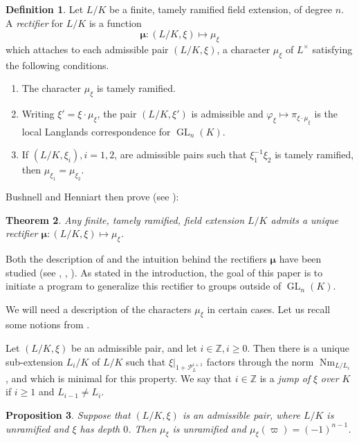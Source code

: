 \documentclass[11pt]{amsart}
\theoremstyle{plain}
\newtheorem{theorem}{Theorem}[section]
\newtheorem{proposition}[theorem]{Proposition}
\theoremstyle{definition}
\newtheorem{definition}[theorem]{Definition}
\DeclareMathOperator{\Nm}{Nm}
\DeclareMathOperator{\GL}{GL}
\newcommand{\PL}{\mathcal{P}_L}
\newcommand{\bmu}{\boldsymbol\mu}
\begin{document}
\begin{definition}\label{rectifierbushnellhenniart}
Let $L/K$ be a finite, tamely ramified field extension, of degree $n$.  A \emph{rectifier}
for $L/K$ is a function
$$\bmu : (L/K, \xi) \mapsto \mu_{\xi}$$
which attaches to each admissible pair $(L/K, \xi)$, a character $\mu_{\xi}$ of $L^{\times}$
satisfying the following conditions.
\begin{enumerate}
\item The character $\mu_{\xi}$ is tamely ramified.
\item Writing $\xi' = \xi \cdot \mu_{\xi}$, the pair $(L/K, \xi')$ is admissible and
$\varphi_{\xi} \mapsto \pi_{\xi \cdot \mu_{\xi}}$ is the local Langlands correspondence
for $\GL_n(K)$.
\item If $(L/K, \xi_i), i = 1,2$, are admissible pairs such that $\xi_1^{-1} \xi_2$ is
tamely ramified, then $ \mu_{\xi_1} =  \mu_{\xi_2}$.
\end{enumerate}
\end{definition}

Bushnell and Henniart then prove (see \cite{bushnell-henniart:10a}):

\begin{theorem}
Any finite, tamely ramified, field extension $L/K$ admits a unique rectifier
$\bmu : (L/K, \xi) \mapsto \mu_{\xi}$.
\end{theorem}

Both the description of and the
intuition behind the rectifiers $\bmu$ have been
studied (see \cite{bushnell-henniart:10a}, \cite{tam:12a}, \cite{adrian:13a}).  As stated in
the introduction, the goal of this paper is to initiate a program to
generalize this rectifier to groups outside of $\GL_n(K)$.

We will need a description of the characters $\mu_{\xi}$ in certain cases.
Let us recall some notions from \cite[\S8]{bushnell-henniart:10a}.

Let $(L/K,\xi)$ be an admissible pair, and let $i \in \mathbb{Z}, i \geq 0$.
Then there is a unique sub-extension $L_i/K$ of $L/K$ such that
$\xi|_{1 + \PL^{i+1}}$ factors through the norm $\Nm_{L/L_i}$,
and which is minimal for this property.  We say that $i \in \mathbb{Z}$
is a \emph{jump of} $\xi$ \emph{over} $K$ if $i \geq 1$ and $L_{i-1} \neq L_i$.

\begin{proposition}\label{prop:BH_result1}
  Suppose that $(L/K, \xi)$ is an admissible pair, where $L/K$
  is unramified and $\xi$ has depth $0$.
  Then $\mu_{\xi}$ is unramified and
  $\mu_{\xi}(\varpi) = (-1)^{n-1}$.
\end{proposition}
\end{document}
